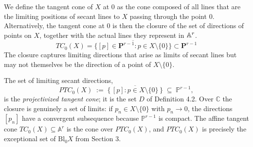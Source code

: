 \documentclass[12pt]{amsproc}
\begin{document}

    We define the tangent cone of $X$ at $0$ as the cone composed of all lines that are the limiting positions of secant lines to $X$ passing through the point $0$. Alternatively, the tangent cone at $0$ is then the closure of the set of directions of points on $X$, together with the actual lines they represent in $\mathbb A^r$. 
    \[TC_0(X) = \overline{\{[p] \in \mathbf{P}^{r-1} : p \in X \setminus \{0\}\}} \subset \mathbf{P}^{r-1}\]
    The closure captures limiting directions that arise as limits of secant lines but may not themselves be the direction of a point of $X \setminus \{0\}$.
    
    \begin{definition}
        The set of limiting secant directions,
        \[
        PTC_0(X)\;:=\;\overline{\{\,[p] : p\in X\setminus\{0\}\,\}}\;\subseteq\;\mathbb{P}^{r-1},
        \]
        is the \emph{projectivized tangent cone}; it is the set $D$ of Definition 4.2.
        Over $\mathbb{C}$ the closure is genuinely a set of limits: if $p_n\in X\setminus\{0\}$
        with $p_n\to 0$, the directions $[p_n]$ have a convergent subsequence because
        $\mathbb{P}^{r-1}$ is compact. The affine tangent cone $TC_0(X)\subseteq\mathbb{A}^r$
        is the cone over $PTC_0(X)$, and $PTC_0(X)$ is precisely the exceptional set of
        $\mathrm{Bl}_0 X$ from Section 3.
    \end{definition}

\end{document}
